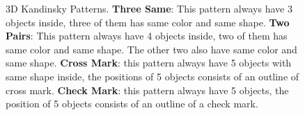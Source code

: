 \documentclass[
]{ceurart}
\begin{document}
	
	\begin{figure}[!htb]
		\centering
		\caption{3D Kandinsky Patterns. 
			\textbf{Three Same}: This pattern always have 3 objects inside, three of them has same color and same shape. 
			\textbf{Two Pairs}: This pattern always have 4 objects inside, two of them has same color and same shape. The other two also have same color and same shape.
			\textbf{Cross Mark}: this pattern always have 5 objects with same shape inside, the positions of 5 objects consists of an outline of cross mark.
			\textbf{Check Mark}: this pattern always have 5 objects, the position of 5 objects consists of an outline of a check mark.}
		\label{fig:3DKP-patterns}
	\end{figure}
	
	
	
\end{document}
